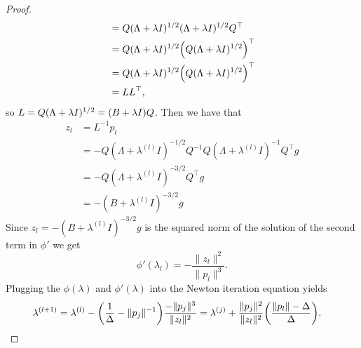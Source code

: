 \documentclass[12pt]{report}
\begin{document}
\begin{problem}
\begin{proof}
\begin{align*}
    &= Q(\Lambda + \lambda  I)^{1/2}(\Lambda + \lambda  I)^{1/2}Q^\top\\ 
    &=Q(\Lambda + \lambda  I)^{1/2}{\left(Q(\Lambda + \lambda  I)^{1/2}\right)}^\top\\ 
    &=Q(\Lambda + \lambda  I)^{1/2}{\left(Q(\Lambda + \lambda  I)^{1/2}\right)}^\top\\ 
    &= LL^\top,
\end{align*}
so $L = Q(\Lambda + \lambda  I)^{1/2} = {\left(B+\lambda I\right)}Q$. Then we have that 
\begin{align*}
    z_l &= L^{-1}p_l\\ 
    &= -Q(\Lambda + \lambda^{(l)}  I)^{-1/2}Q^{-1}Q(\Lambda + \lambda^{(l)} I)^{-1}Q^\top g\\
    &= -Q(\Lambda + \lambda^{(l)}  I)^{-3/2}Q^\top g\\
    &= -(B + \lambda^{(l)}  I)^{-3/2}g    
\end{align*}
Since $z_l = -(B + \lambda^{(l)} I)^{-3/2}g$ is the squared norm of the solution of the second term in $\phi'$ we get
\begin{equation*}
    \phi'(\lambda_l) = -\frac{\|z_l\|^2}{\|p_l\|^3}.
\end{equation*}
Plugging the $\phi(\lambda)$ and $\phi'(\lambda)$ into the Newton iteration equation yields
\begin{align*}
    \lambda^{(l+1)} &= \lambda^{(l)} - {\left(\frac{1}{\Delta}-\|p_j\|^{-1}\right)}\frac{-\|p_j\|^3}{\|z_l\|^2} = \lambda^{(j)} + \frac{\|p_j\|^2}{\|z_l\|^2}{\left(\frac{\|p_l\| - \Delta}{\Delta}\right)}.
\end{align*}





\end{proof}
\end{problem}

\end{document}
